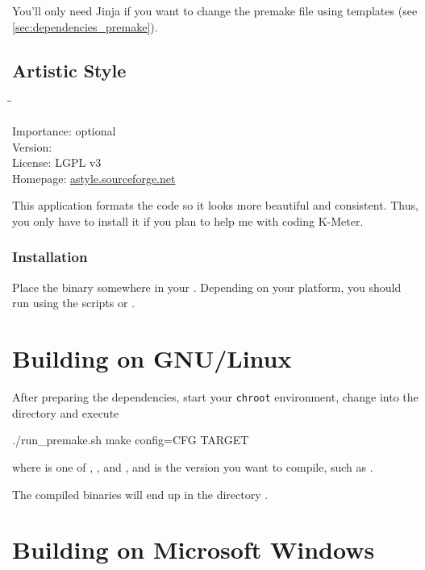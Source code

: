 You'll only need Jinja if you want to change the premake file using
templates (see \ref{sec:dependencies_premake}).

\subsection{Artistic Style}

\begin{tabbing}
  \hspace*{6em}\=\=\kill

  Importance:  \> optional \\
  Version:      \\
  License:     \> LGPL v3 \\
  Homepage:    \> \href{http://astyle.sourceforge.net/}{astyle.sourceforge.net}
\end{tabbing}

This application formats the code so it looks more beautiful and
consistent.  Thus, you only have to install it if you plan to help me
with coding K-Meter.

\subsubsection{Installation}

Place the binary somewhere in your .  Depending on your
platform, you should run  using the scripts
 or .

\section{Building on GNU/Linux}

After preparing the dependencies, start your \texttt{chroot}
environment, change into the directory  and execute

\begin{VerbatimBoth}
  ./run_premake.sh
  make config=CFG TARGET
\end{VerbatimBoth}

where  is one of ,
,  and
, and  is the version you
want to compile, such as .

The compiled binaries will end up in the directory .

\section{Building on Microsoft Windows}

